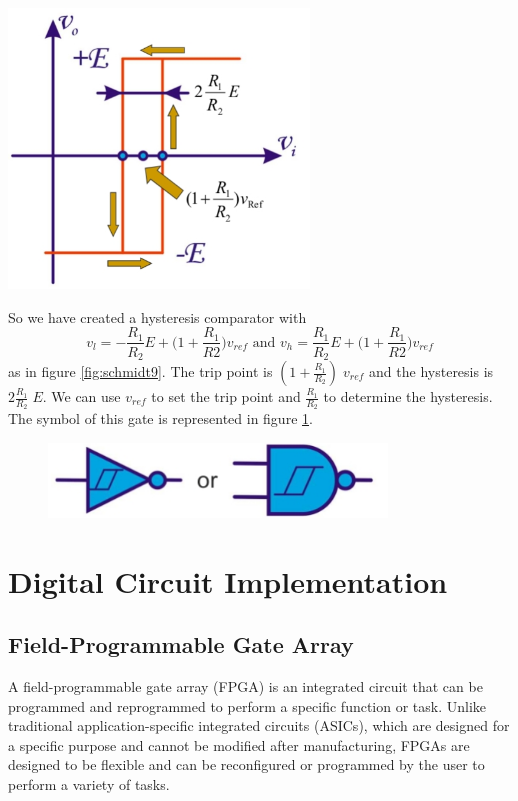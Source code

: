 \begin{minipage}{.5\textwidth}
	\centering
	\includegraphics[width=8cm]{figures/ch15/schmidt9.jpg}
	\label{fig:schmidt9}
\end{minipage}
So we have created a hysteresis comparator with 
$$v_l = -\frac{R_1}{R_2} E + \bigg( 1 + \frac{R_1}{R2} \bigg) v_{ref}  \text{ and } v_h = \frac{R_1}{R_2} E + \bigg(1 + \frac{R_1}{R2} \bigg) v_{ref}$$
as in figure \ref{fig:schmidt9}. The trip point is $(1 + \frac{R_1}{R_2})\; v_{ref}$ and the hysteresis is $2\frac{R_1}{R_2} \; E$. We can use $v_{ref}$ to set the trip point and $\frac{R_1}{R_2}$ to determine the hysteresis.\\
The symbol of this gate is represented in figure \ref{fig:schmidt10}.
\begin{figure}[h!]
	\centering
	\includegraphics[width=9cm]{figures/ch15/schmidt10.jpg}
	\caption{}
	\label{fig:schmidt10}
\end{figure}

\chapter{Digital Circuit Implementation}
\section{Field-Programmable Gate Array}
A field-programmable gate array (FPGA) is an integrated circuit that can be programmed and reprogrammed to perform a specific function or task. Unlike traditional application-specific integrated circuits (ASICs), which are designed for a specific purpose and cannot be modified after manufacturing, FPGAs are designed to be flexible and can be reconfigured or programmed by the user to perform a variety of tasks.

